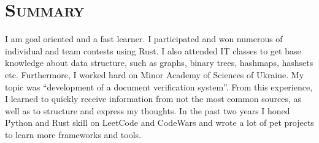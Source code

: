 \vspace*{-3em}
\section{\textsc{Summary}}

I am goal oriented and a fast learner.
I participated and won numerous of individual and team contests using Rust.
I also attended IT classes to get base knowledge about data structure, such as graphs, binary trees, hashmaps, hashsets etc. 
Furthermore, I worked hard on Minor Academy of Sciences of Ukraine. 
My topic was “development of a document verification system”. 
From this experience, I learned to quickly receive information from not the most common sources, as well as to structure and express my thoughts. 
In the past two years I honed Python and Rust skill on LeetCode and CodeWars and wrote a lot of pet projects to learn more frameworks and tools.
